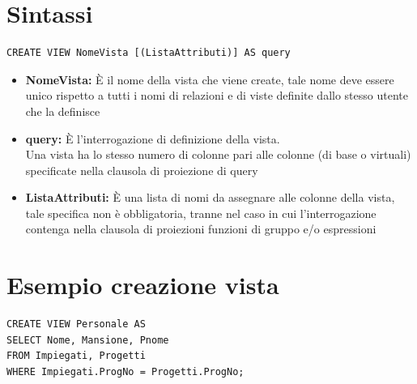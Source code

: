 \section{Sintassi}
\begin{lstlisting}
CREATE VIEW NomeVista [(ListaAttributi)] AS query
\end{lstlisting}
\begin{itemize}
    \item \textbf{NomeVista:} È il nome della vista che viene create, tale nome deve essere unico rispetto a tutti i nomi di relazioni e di viste definite dallo stesso utente che la definisce
    \item \textbf{query:} È l'interrogazione di definizione della vista.\\
    Una vista ha lo stesso numero di colonne pari alle colonne (di base o virtuali) specificate nella clausola di proiezione di query
    \item \textbf{ListaAttributi:} È una lista di nomi da assegnare alle colonne della vista, tale specifica non è obbligatoria, tranne nel caso in cui l'interrogazione contenga nella clausola di proiezioni funzioni di gruppo e/o espressioni
\end{itemize}

\section{Esempio creazione vista}
\begin{lstlisting}[language=sql_generic]
CREATE VIEW Personale AS 
SELECT Nome, Mansione, Pnome 
FROM Impiegati, Progetti 
WHERE Impiegati.ProgNo = Progetti.ProgNo;
\end{lstlisting}